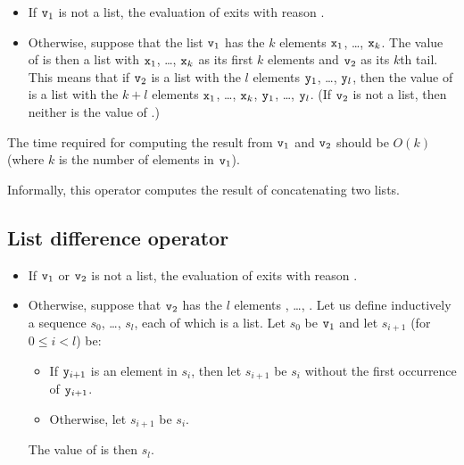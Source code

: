\begin{itemize}
\item If ${\tt{\sl v}}_1$ is not a list,
the evaluation of  exits with reason .
\item Otherwise, suppose that the list ${\tt{\sl v}}_1$ has the $k$ elements
${\tt{\sl x}}_1$, \ldots, ${\tt{\sl x}}_k$.  The value of  
is then a list with ${\tt{\sl x}}_1$, \ldots, ${\tt{\sl x}}_k$ as its first
$k$ elements and ${\tt{\sl v}}_2$ as its $k$th tail.  This means that if
${\tt{\sl v}}_2$ is a list with the $l$ elements
${\tt{\sl y}}_1$, \ldots, ${\tt{\sl y}}_l$, then the value of  is a list with the $k+l$ elements
${\tt{\sl x}}_1$, \ldots, ${\tt{\sl x}}_k$, ${\tt{\sl y}}_1$, \ldots, ${\tt{\sl y}}_l$.
(If ${\tt{\sl v}}_2$ is not a list, then neither is the value of
.)
\end{itemize}

The time required for computing the result from ${\tt{\sl v}}_1$ and
${\tt{\sl v}}_2$ should be %
$O(k)$ (where $k$ is the number of elements in ${\tt{\sl v}}_1$).

Informally, this operator computes the result of concatenating two lists.

\subsection{List difference operator \T{--}}

\label{section:list-subtraction}

\begin{itemize}
\item If ${\tt{\sl v}}_1$ or ${\tt{\sl v}}_2$ is not a list,
the evaluation of  exits with reason .
\item Otherwise, suppose that ${\tt{\sl v}}_2$ has the $l$ elements
, \ldots, .  Let us define inductively a sequence $s_0$, \ldots,
$s_l$, each of which is a list.  Let $s_0$ be ${\tt{\sl v}}_1$ and let $s_{i+1}$ (for $0\leq i<l$)
be:
\begin{itemize}
\item If ${\tt{\sl y}}_{i+1}$ is an element in $s_i$, then let $s_{i+1}$ be $s_i$ without the
first occurrence of ${\tt{\sl y}}_{i+1}$.
\item Otherwise, let $s_{i+1}$ be $s_i$.
\end{itemize}
The value of  is then $s_l$.
\end{itemize}

